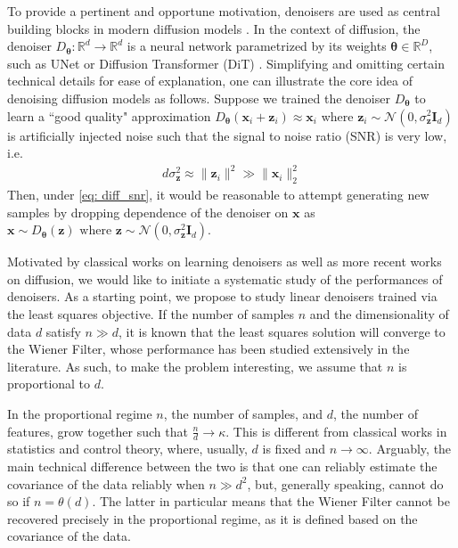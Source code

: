 \documentclass[final]{l4dc2026}
\newcommand{\btheta}{\bm{\theta}}
\newcommand{\bI}{\mathbf{I}}
\newcommand{\bx}{\mathbf{x}}
\newcommand{\bz}{\mathbf{z}}
\newcommand{\bbR}{\mathbb{R}}
\begin{document}
To provide a pertinent and opportune motivation, denoisers are used as central building blocks in modern diffusion models \citep{songscore, song2019generative}. In the context of diffusion, the denoiser $D_{\btheta}: \bbR^d \rightarrow \bbR^d$ is a neural network parametrized by its weights $\btheta \in \bbR^D$, such as UNet \citep{ho2020denoising} or  Diffusion Transformer (DiT) \citep{peebles2023scalable}. Simplifying and omitting certain technical details for ease of explanation, one can illustrate the core idea of  denoising diffusion models as follows. Suppose we trained the denoiser $D_{\btheta}$ to learn a ``good quality" approximation $D_{\btheta}(\bx_i + \bz_i) \approx \bx_i$
where $\bz_i \sim \mathcal{N}(0, \sigma_{\bz}^2\bI_d)$ is artificially injected noise such that the signal to noise ratio (SNR) is very low, i.e. 
\begin{align}\label{eq: diff_snr}
d\sigma_{\bz}^2 \approx \|\bz_i\|^2 \gg \|\bx_i\|_2^2 
\end{align}
Then, under \eqref{eq: diff_snr}, it would be reasonable to attempt generating new samples by dropping dependence of the denoiser on $\bx$  as $\bx \sim D_{\btheta}(\bz) \text{ where } \bz \sim \mathcal{N}(0, \sigma_{\bz}^2\bI_d)$.

Motivated by classical works on learning denoisers as well as more recent works on diffusion, we would like to initiate a systematic study of the performances of  denoisers. 
As a starting point, we propose to study linear denoisers trained via the least squares objective. 
If the number of samples $n$ and the dimensionality of data $d$ satisfy $n \gg d$, it is known that the least squares solution will converge to the Wiener Filter, whose performance has been studied extensively in the literature. As such, to make the problem interesting, we assume that $n$ is proportional to $d$.

In the proportional regime $n$, the number of samples, and $d$, the number of features, grow together such that $\frac{n}{d} \rightarrow \kappa$. This is different from classical works in statistics and control theory, where, usually, $d$ is fixed and $n \rightarrow \infty$. Arguably, the main technical difference between the two is that one can reliably estimate the covariance of the data reliably when $n \gg d^2$, but, generally speaking, cannot do so if $n = \theta(d)$. The latter in particular means that the Wiener Filter cannot be recovered precisely in the proportional regime, as it is defined based on the covariance of the data. 
\end{document}
